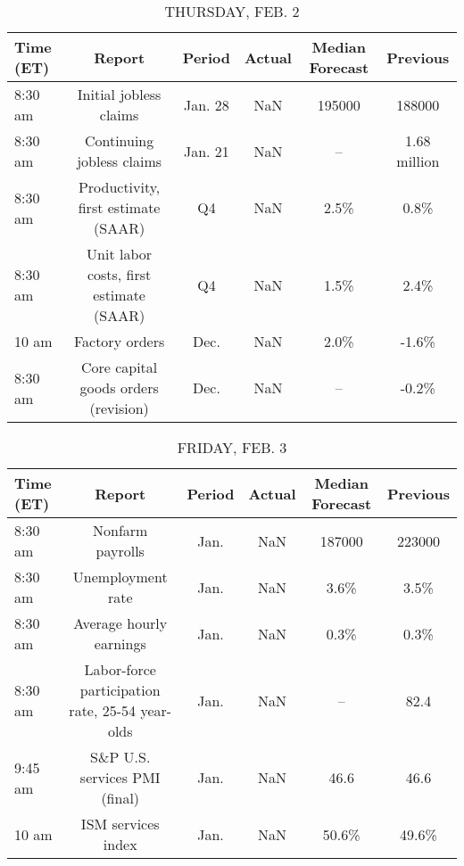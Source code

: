 \documentclass{article}%
\begin{document}
\begin{table}[htbp]%
\caption{THURSDAY, FEB. 2}%
\centering%
\begin{adjustbox}{width=1\textwidth}%
\begin{tabular}{lccccc}
\toprule
Time (ET) &                                  Report &  Period & Actual & Median Forecast &     Previous \\
\midrule
  8:30 am &                  Initial jobless claims & Jan. 28 &    NaN &          195000 &       188000 \\
  8:30 am &               Continuing jobless claims & Jan. 21 &    NaN &              -- & 1.68 million \\
  8:30 am &     Productivity, first estimate (SAAR) &      Q4 &    NaN &            2.5\% &         0.8\% \\
  8:30 am & Unit labor costs, first estimate (SAAR) &      Q4 &    NaN &            1.5\% &         2.4\% \\
    10 am &                          Factory orders &    Dec. &    NaN &            2.0\% &        -1.6\% \\
  8:30 am &    Core capital goods orders (revision) &    Dec. &    NaN &              -- &        -0.2\% \\
\bottomrule
\end{tabular}
%
\end{adjustbox}%
\end{table}

%


\begin{table}[htbp]%
\caption{FRIDAY, FEB. 3}%
\centering%
\begin{adjustbox}{width=1\textwidth}%
\begin{tabular}{lccccc}
\toprule
Time (ET) &                                          Report & Period & Actual & Median Forecast & Previous \\
\midrule
  8:30 am &                                Nonfarm payrolls &   Jan. &    NaN &          187000 &   223000 \\
  8:30 am &                               Unemployment rate &   Jan. &    NaN &            3.6\% &     3.5\% \\
  8:30 am &                         Average hourly earnings &   Jan. &    NaN &            0.3\% &     0.3\% \\
  8:30 am & Labor-force participation rate, 25-54 year-olds &   Jan. &    NaN &              -- &     82.4 \\
  9:45 am &                   S\&P U.S. services PMI (final) &   Jan. &    NaN &            46.6 &     46.6 \\
    10 am &                              ISM services index &   Jan. &    NaN &           50.6\% &    49.6\% \\
\bottomrule
\end{tabular}
%
\end{adjustbox}%
\end{table}
\end{document}
